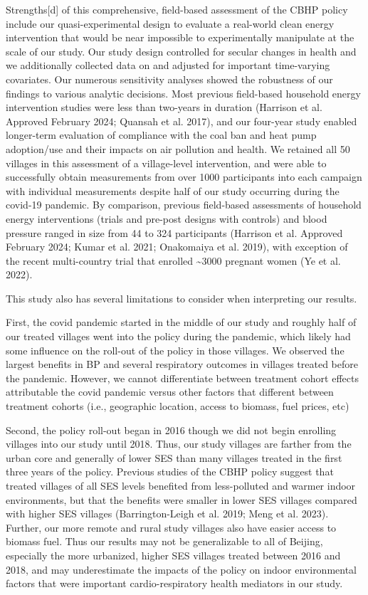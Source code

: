 \documentclass[
  letterpaper,
  DIV=11,
  numbers=noendperiod]{scrartcl}
\begin{document}
Strengths{[}d{]} of this comprehensive, field-based assessment of the
CBHP policy include our quasi-experimental design to evaluate a
real-world clean energy intervention that would be near impossible to
experimentally manipulate at the scale of our study. Our study design
controlled for secular changes in health and we additionally collected
data on and adjusted for important time-varying covariates. Our numerous
sensitivity analyses showed the robustness of our findings to various
analytic decisions. Most previous field-based household energy
intervention studies were less than two-years in duration (Harrison et
al. Approved February 2024; Quansah et al. 2017), and our four-year
study enabled longer-term evaluation of compliance with the coal ban and
heat pump adoption/use and their impacts on air pollution and health. We
retained all 50 villages in this assessment of a village-level
intervention, and were able to successfully obtain measurements from
over 1000 participants into each campaign with individual measurements
despite half of our study occurring during the covid-19 pandemic. By
comparison, previous field-based assessments of household energy
interventions (trials and pre-post designs with controls) and blood
pressure ranged in size from 44 to 324 participants (Harrison et al.
Approved February 2024; Kumar et al. 2021; Onakomaiya et al. 2019), with
exception of the recent multi-country trial that enrolled
\textasciitilde3000 pregnant women (Ye et al. 2022).

This study also has several limitations to consider when interpreting
our results.

First, the covid pandemic started in the middle of our study and roughly
half of our treated villages went into the policy during the pandemic,
which likely had some influence on the roll-out of the policy in those
villages. We observed the largest benefits in BP and several respiratory
outcomes in villages treated before the pandemic. However, we cannot
differentiate between treatment cohort effects attributable the covid
pandemic versus other factors that different between treatment cohorts
(i.e., geographic location, access to biomass, fuel prices, etc)

Second, the policy roll-out began in 2016 though we did not begin
enrolling villages into our study until 2018. Thus, our study villages
are farther from the urban core and generally of lower SES than many
villages treated in the first three years of the policy. Previous
studies of the CBHP policy suggest that treated villages of all SES
levels benefited from less-polluted and warmer indoor environments, but
that the benefits were smaller in lower SES villages compared with
higher SES villages (Barrington-Leigh et al. 2019; Meng et al. 2023).
Further, our more remote and rural study villages also have easier
access to biomass fuel. Thus our results may not be generalizable to all
of Beijing, especially the more urbanized, higher SES villages treated
between 2016 and 2018, and may underestimate the impacts of the policy
on indoor environmental factors that were important cardio-respiratory
health mediators in our study.
\end{document}
